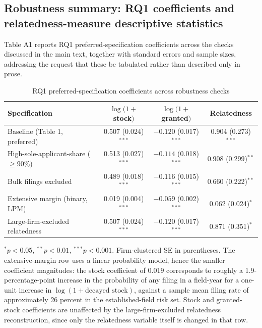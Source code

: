 \documentclass[12pt]{article}
\begin{document}
\subsection{Robustness summary: RQ1 coefficients and relatedness-measure descriptive statistics}

Table A1 reports RQ1 preferred-specification coefficients across the checks discussed in the main text, together with standard errors and sample sizes, addressing the request that these be tabulated rather than described only in prose.

\begin{table}[htbp]
\centering
\small
\caption{RQ1 preferred-specification coefficients across robustness checks}
\label{tab:appendixA1}
\begin{tabular}{lccc}
\toprule
Specification & $\log(1{+}$stock$)$ & $\log(1{+}$granted$)$ & Relatedness \\
\midrule
Baseline (Table 1, preferred) & 0.507 (0.024)$^{***}$ & $-0.120$ (0.017)$^{***}$ & 0.904 (0.273)$^{***}$ \\
High-sole-applicant-share ($\geq$90\%) & 0.513 (0.027)$^{***}$ & $-0.114$ (0.018)$^{***}$ & 0.908 (0.299)$^{**}$ \\
Bulk filings excluded & 0.489 (0.018)$^{***}$ & $-0.116$ (0.015)$^{***}$ & 0.660 (0.222)$^{**}$ \\
Extensive margin (binary, LPM) & 0.019 (0.004)$^{***}$ & $-0.059$ (0.002)$^{***}$ & 0.062 (0.024)$^{*}$ \\
Large-firm-excluded relatedness & 0.507 (0.024)$^{***}$ & $-0.120$ (0.017)$^{***}$ & 0.871 (0.351)$^{*}$ \\
\bottomrule
\end{tabular}
\begin{minipage}{\textwidth}
\vspace{2pt}
\footnotesize $^{*}p<0.05$, $^{**}p<0.01$, $^{***}p<0.001$. Firm-clustered SE in parentheses. The extensive-margin row uses a linear probability model, hence the smaller coefficient magnitudes: the stock coefficient of $0.019$ corresponds to roughly a 1.9-percentage-point increase in the probability of any filing in a field-year for a one-unit increase in $\log(1+\text{decayed stock})$, against a sample mean filing rate of approximately 26 percent in the established-field risk set. Stock and granted-stock coefficients are unaffected by the large-firm-excluded relatedness reconstruction, since only the relatedness variable itself is changed in that row.
\end{minipage}
\end{table}
\end{document}
